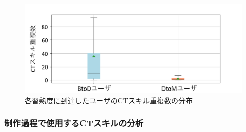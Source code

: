 \documentclass[submit,ses,noauthor]{ipsj}
\begin{document}
\begin{figure}[t]
	\centering
	\includegraphics[width=0.8\linewidth]{Okamoto_fig/dupli-all.pdf}
	\caption{各習熟度に到達したユーザのCTスキル重複数の分布}
	\label{fig:dupli-mean}
\end{figure}


\subsubsection{制作過程で使用するCTスキルの分析}\label{subsec:ct-analysis}

\end{document}
